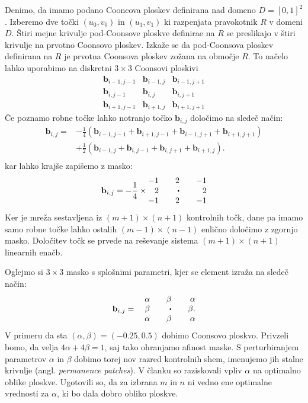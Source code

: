 \documentclass[a4paper,12pt]{article}
\begin{document}
Denimo, da imamo podano Cooncova ploskev definirana nad domeno $D = [0,1]^2$. 
Izberemo dve točki $(u_0,v_0)$ in $(u_1,v_1)$ ki razpenjata pravokotnik $R$ v domeni $D$. 
Štiri mejne krivulje pod-Coonsove ploskve definirae na $R$ se preslikajo 
v štiri krivulje na prvotno Coonsovo ploskev. Izkaže se da pod-Coonsova ploskev 
definirana na $R$ je prvotna Coonsova ploskev zožana na območje $R$. To načelo 
lahko uporabimo na diskretni $3 \times 3$ Coonsovi ploskivi
$$
\begin{matrix} 
   \mathbf{b}_{i-1,j-1} & \mathbf{b}_{i-1,j} & \mathbf{b}_{i-1,j+1}\\
   \mathbf{b}_{i,j-1} & \mathbf{b}_{i,j} & \mathbf{b}_{i,j+1}\\
   \mathbf{b}_{i+1,j-1} & \mathbf{b}_{i+1,j} & \mathbf{b}_{i+1,j+1}
\end{matrix}
$$ 
Če poznamo robne točke lahko notranjo točko $\mathbf{b}_{i,j}$ določimo na sledeč način: 
\begin{align*}
   \mathbf{b}_{i,j} =& -\frac{1}{4}(\mathbf{b}_{i-1,j-1} + \mathbf{b}_{i+1,j-1} +
      \mathbf{b}_{i-1,j+1} + \mathbf{b}_{i+1,j+1}) \\
      &+\frac{1}{2}(\mathbf{b}_{i-1,j} + \mathbf{b}_{i,j-1}+
      \mathbf{b}_{i,j+1} + \mathbf{b}_{i+1,j}).\\
\end{align*}
kar lahko krajše zapišemo z masko: 
$$
\mathbf{b}_{i,j} = -\frac{1}{4} \times 
\begin{matrix*}[r]
-1 && 2 && -1 \\
2 && \sbullet && 2\\
-1 && 2 && -1
\end{matrix*}
$$
Ker je mreža sestavljena iz $(m+1)\times(n+1)$ kontrolnih točk, dane pa imamo samo robne
točke lahko ostalih $(m-1)\times(n-1)$ enlično določimo z zgornjo masko. Določitev točk se prvede
na reševanje sistema $(m+1)\times(n+1)$ linearnih enačb.

Oglejmo si $3 \times 3$ masko s splošnimi parametri, kjer se element izraža na sledeč način:
$$
\mathbf{b}_{i,j} =  \quad 
\begin{matrix*}[r]
\alpha && \beta && \alpha \\
\beta && \sbullet && \beta. \\
\alpha && \beta && \alpha
\end{matrix*}
$$
V primeru da sta $(\alpha, \beta) = (-0.25, 0.5)$ dobimo Coonsovo
ploskvo. Privzeli bomo, da velja $4\alpha + 4\beta = 1$, saj 
tako ohranjamo afinost maske. S perturbiranjem parametrov 
$\alpha$ in $\beta$ dobimo torej nov razred kontrolnih shem, imenujemo jih stalne 
krivulje (angl. \textit{permanence patches}). V članku \cite{DCP}  so raziskovali
vpliv $\alpha$ na optimalno oblike ploskve. Ugotovili so, da za izbrana $m$ in $n$
ni vedno ene optimalne vrednosti za $\alpha$, ki bo dala dobro obliko ploskve.
\end{document}
